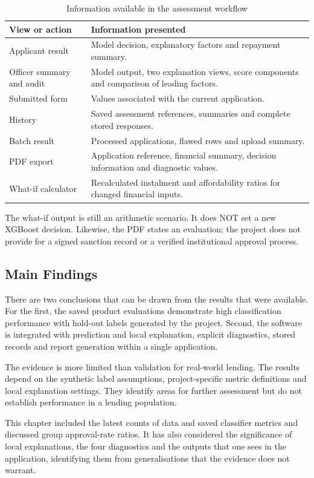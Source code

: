 \begin{table}[htbp]\centering\small
\caption{Information available in the assessment workflow}\label{tab:interface-results}
\begin{tabularx}{\textwidth}{p{3.9cm}X}\toprule
View or action & Information presented\\\midrule
Applicant result & Model decision, explanatory factors and repayment summary.\\
Officer summary and audit & Model output, two explanation views, score components and comparison of leading factors.\\
Submitted form & Values associated with the current application.\\
History & Saved assessment references, summaries and complete stored responses.\\
Batch result & Processed applications, flawed rows and upload summary.\\
PDF export & Application reference, financial summary, decision information and diagnostic values.\\
What-if calculator & Recalculated instalment and affordability ratios for changed financial inputs.\\\bottomrule
\end{tabularx}\end{table}

The what-if output is still an arithmetic scenario. It does NOT set a new XGBoost decision. Likewise, the PDF states an evaluation; the project does not provide for a signed sanction record or a verified institutional approval process.

\subsection{Main Findings}
There are two conclusions that can be drawn from the results that were available. For the first, the saved product evaluations demonstrate high classification performance with hold-out labels generated by the project. Second, the software is integrated with prediction and local explanation, explicit diagnostics, stored records and report generation within a single application.

The evidence is more limited than validation for real-world lending. The results depend on the synthetic label assumptions, project-specific metric definitions and local explanation settings. They identify areas for further assessment but do not establish performance in a lending population.

\par\medskip\noindent
This chapter included the latest counts of data and saved classifier metrics and discussed group approval-rate ratios. It has also considered the significance of local explanations, the four diagnostics and the outputs that one sees in the application, identifying them from generalisations that the evidence does not warrant.
